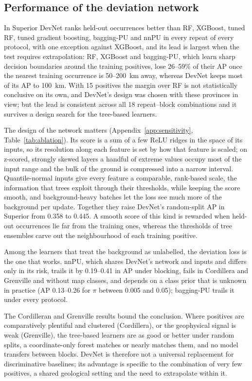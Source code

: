 \documentclass[pdflatex,sn-apa]{sn-jnl}
\begin{document}
\subsection{Performance of the deviation network}\label{sec:disc-devnet}

In Superior DevNet ranks held-out occurrences better than RF, XGBoost, tuned RF, tuned gradient boosting, bagging-PU and nnPU in every repeat of every protocol, with one exception against XGBoost, and its lead is largest when the test requires extrapolation: RF, XGBoost and bagging-PU, which learn sharp decision boundaries around the training positives, lose 26--59\% of their AP once the nearest training occurrence is 50--200~km away, whereas DevNet keeps most of its AP to 100~km. With 15 positives the margin over RF is not statistically conclusive on its own, and DevNet's design was chosen with these provinces in view; but the lead is consistent across all 18 repeat--block combinations and it survives a design search for the tree-based learners.

The design of the network matters (Appendix~\ref{app:sensitivity}, Table~\ref{tab:ablation}). Its score is a sum of a few ReLU ridges in the space of its inputs, so its resolution along each feature is set by how that feature is scaled; on z-scored, strongly skewed layers a handful of extreme values occupy most of the input range and the bulk of the ground is compressed into a narrow interval. Quantile-normal inputs give every feature a comparable, rank-based scale, the information that trees exploit through their thresholds, while keeping the score smooth, and background-heavy batches let the loss see much more of the background per update. Together they raise DevNet's random-split AP in Superior from 0.358 to 0.445. A smooth score of this kind is rewarded when held-out occurrences lie far from the training ones, whereas the thresholds of tree ensembles carve out the neighbourhood of each training positive.

Among the learners that treat the background as unlabelled, the deviation loss is the one that works. nnPU, which shares DevNet's network and inputs and differs only in its risk, trails it by 0.19--0.41 in AP under blocking, fails in Cordillera and Grenville and without map classes, and depends on a class prior that is unknown in practice (AP 0.13--0.26 for $\pi$ between 0.005 and 0.05); bagging-PU trails it under every protocol.

The Cordilleran and Grenville results bound the conclusion. Where positives are comparatively plentiful and clustered (Cordillera), or the geophysical signal is weak (Grenville), the tree-based learners are as good or better under random splits, a coordinate-only forest matches or nearly matches them, and no model transfers between blocks. DevNet is therefore not a universal replacement for discriminative baselines; its advantage is specific to the combination of very few positives, a shared geological setting and the need to extrapolate within it.
\end{document}
